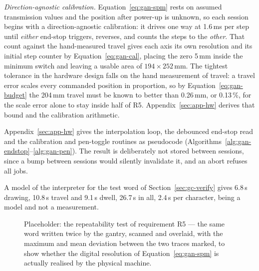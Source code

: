 \emph{Direction-agnostic calibration.}
\label{sec:gan-calib}
Equation~\ref{eq:gan-spm} rests on assumed transmission values and the position after power-up is unknown, so each session begins with a direction-agnostic calibration: it drives one way at 1.6\,ms per step until \emph{either} end-stop triggers, reverses, and counts the steps to the \emph{other}. That count against the hand-measured travel gives each axis its own resolution and its initial step counter by Equation~\ref{eq:gan-cal}, placing the zero 5\,mm inside the minimum switch and leaving a usable area of $194\times252$\,mm. The tightest tolerance in the hardware design falls on the hand measurement of travel: a travel error scales every commanded position in proportion, so by Equation~\ref{eq:gan-budget} the 204\,mm travel must be known to better than 0.26\,mm, or 0.13\,\%, for the scale error alone to stay inside half of R5. Appendix~\ref{sec:app-hw} derives that bound and the calibration arithmetic.

Appendix~\ref{sec:app-hw} gives the interpolation loop, the debounced end-stop read and the calibration and pen-toggle routines as pseudocode (Algorithms~\ref{alg:gan-endstop}--\ref{alg:gan-pen}). The result is deliberately not stored between sessions, since a bump between sessions would silently invalidate it, and an abort refuses all jobs.

A model of the interpreter for the test word of Section~\ref{sec:gc-verify} gives 6.8\,s drawing, 10.8\,s travel and 9.1\,s dwell, 26.7\,s in all, 2.4\,s per character, being a model and not a measurement.

\begin{figure}[htb]
\centering
{}
\captionsetup{singlelinecheck=false,justification=justified}
\caption{Placeholder: the repeatability test of requirement R5 --- the same word written twice by the gantry, scanned and overlaid, with the maximum and mean deviation between the two traces marked, to show whether the digital resolution of Equation~\ref{eq:gan-spm} is actually realised by the physical machine.}
\label{fig:gan-repeat}
\end{figure}

